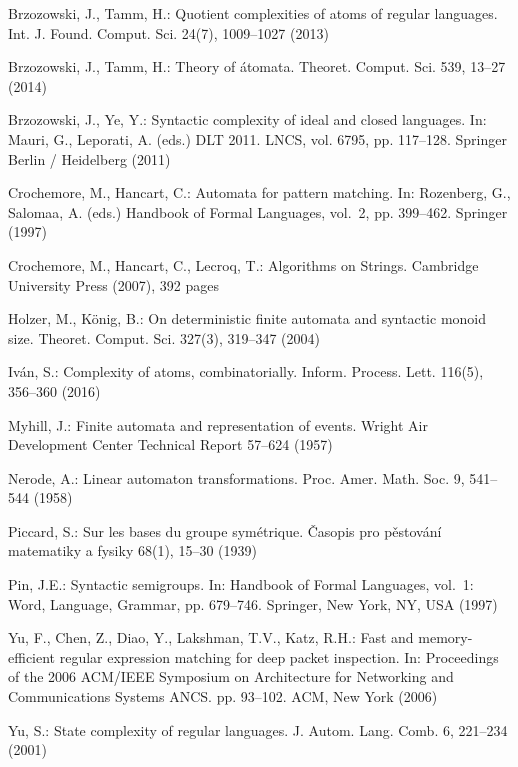 \documentclass[final]{dmtcs-episciences}
\theoremstyle{definition}
\theoremstyle{remark}
\begin{document}
\begin{thebibliography}{10}
Brzozowski, J., Tamm, H.: Quotient complexities of atoms of regular languages.
  Int. J. Found. Comput. Sci.  24(7),  1009--1027 (2013)

Brzozowski, J., Tamm, H.: Theory of \'atomata. Theoret. Comput. Sci.  539,
  13--27 (2014)

Brzozowski, J., Ye, Y.: Syntactic complexity of ideal and closed languages. In:
  Mauri, G., Leporati, A. (eds.) DLT 2011. LNCS, vol. 6795, pp. 117--128.
  Springer Berlin / Heidelberg (2011)

Crochemore, M., Hancart, C.: Automata for pattern matching. In: Rozenberg, G.,
  Salomaa, A. (eds.) Handbook of Formal Languages, vol.~2, pp. 399--462.
  Springer (1997)

Crochemore, M., Hancart, C., Lecroq, T.: Algorithms on Strings. Cambridge
  University Press (2007), 392 pages

Holzer, M., K\"{o}nig, B.: On deterministic finite automata and syntactic
  monoid size. Theoret. Comput. Sci.  327(3),  319--347 (2004)

Iv\'an, S.: Complexity of atoms, combinatorially. Inform. Process. Lett.
  116(5),  356--360 (2016)

Myhill, J.: Finite automata and representation of events. Wright Air
  Development Center Technical Report  57--624 (1957)

Nerode, A.: Linear automaton transformations. Proc. Amer. Math. Soc.  9,
  541--544 (1958)

Piccard, S.: Sur les bases du groupe sym\'etrique. \v{C}asopis pro
  p\v{e}stov\'an\'i matematiky a fysiky  68(1),  15--30 (1939)

Pin, J.E.: Syntactic semigroups. In: Handbook of Formal Languages, vol.~1:
  Word, Language, Grammar, pp. 679--746. Springer, New York, NY, USA (1997)

Yu, F., Chen, Z., Diao, Y., Lakshman, T.V., Katz, R.H.: Fast and
  memory-efficient regular expression matching for deep packet inspection. In:
  Proceedings of the 2006 ACM/IEEE Symposium on Architecture for Networking and
  Communications Systems ANCS\/. pp. 93--102. ACM, New York (2006)

Yu, S.: State complexity of regular languages. J. Autom. Lang. Comb.  6,
  221--234 (2001)

\end{thebibliography}
\end{document}
